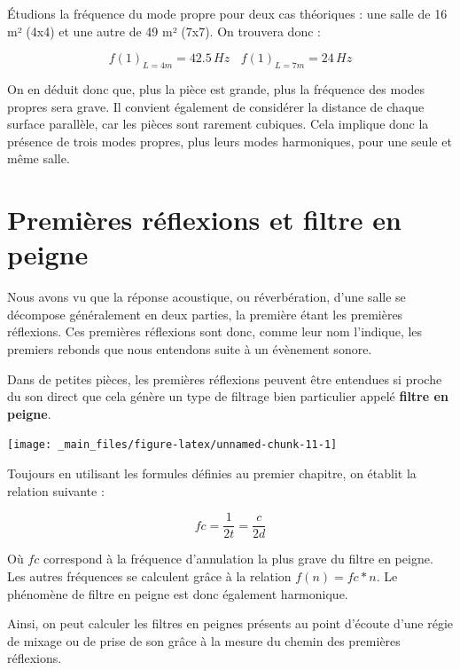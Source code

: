 \documentclass[
]{book}
\begin{document}
Étudions la fréquence du mode propre pour deux cas théoriques : une salle de 16 m² (4x4) et une autre de 49 m² (7x7). On trouvera donc :

\[f(1)_{L=4m} = 42.5 \,Hz \>\>\>\> f(1)_{L=7m} = 24 \,Hz\]

On en déduit donc que, plus la pièce est grande, plus la fréquence des modes propres sera grave. Il convient également de considérer la distance de chaque surface parallèle, car les pièces sont rarement cubiques. Cela implique donc la présence de trois modes propres, plus leurs modes harmoniques, pour une seule et même salle.

\hypertarget{premiuxe8res-ruxe9flexions-et-filtre-en-peigne}{%
\section{Premières réflexions et filtre en peigne}\label{premiuxe8res-ruxe9flexions-et-filtre-en-peigne}}

Nous avons vu que la réponse acoustique, ou réverbération, d'une salle se décompose généralement en deux parties, la première étant les premières réflexions. Ces premières réflexions sont donc, comme leur nom l'indique, les premiers rebonds que nous entendons suite à un évènement sonore.

Dans de petites pièces, les premières réflexions peuvent être entendues si proche du son direct que cela génère un type de filtrage bien particulier appelé \textbf{filtre en peigne}.

\begin{center}\texttt{[image: \_main\_files/figure-latex/unnamed-chunk-11-1]} \end{center}

Toujours en utilisant les formules définies au premier chapitre, on établit la relation suivante :

\[ fc = \frac 1{2t} = \frac c{2d} \]

Où \(fc\) correspond à la fréquence d'annulation la plus grave du filtre en peigne. Les autres fréquences se calculent grâce à la relation \(f(n) = fc*n\). Le phénomène de filtre en peigne est donc également harmonique.

Ainsi, on peut calculer les filtres en peignes présents au point d'écoute d'une régie de mixage ou de prise de son grâce à la mesure du chemin des premières réflexions.
\end{document}
